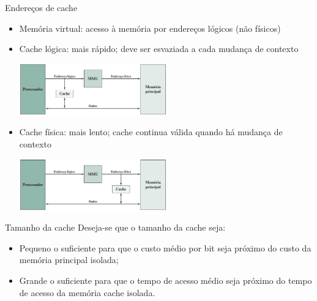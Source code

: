 \begin{slide}{Endereços de cache}
\begin{itemize}
	\item Memória virtual: acesso à memória por endereços lógicos (não físicos)
	\item Cache lógica: mais rápido; deve ser esvaziada a cada mudança de contexto
		\begin{center}
			\includegraphics[width=0.5\textwidth]{figs/cache-logica}
		\end{center}
	\item Cache física: mais lento; cache continua válida quando há mudança de contexto
		\begin{center}
			\includegraphics[width=0.5\textwidth]{figs/cache-fisica}
		\end{center}
\end{itemize}
\end{slide}

\begin{slide}{Tamanho da cache}
Deseja-se que o tamanho da cache seja:
\begin{itemize}
 \item Pequeno o suficiente para que o custo médio por bit seja próximo do custo da memória principal isolada;
 \item Grande o suficiente para que o tempo de acesso médio seja próximo do tempo de acesso da memória cache isolada.
\end{itemize}
\end{slide}


